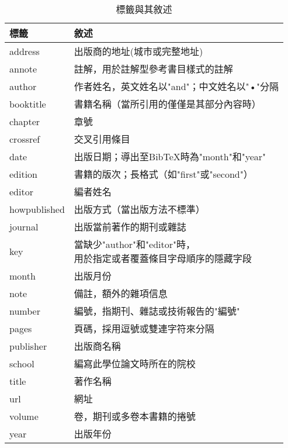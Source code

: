 	
	\begin{table}[H]
	\centering
 	\extrarowheight=3pt
    \caption{標籤與其敘述}\label{ref_lab}
		\begin{tabular}{ll}
		\hline
		標籤 & 敘述 \\
		\hline
		address & 出版商的地址(城市或完整地址) \\
		\rowcolor{lightpink}
		annote & 註解，用於註解型參考書目樣式的註解 \\
		author & 作者姓名，英文姓名以"and"；中文姓名以"•"分隔 \\
		\rowcolor{lightpink}
		booktitle & 書籍名稱（當所引用的僅僅是其部分內容時） \\
		chapter & 章號 \\
		\rowcolor{lightpink}
		crossref & 交叉引用條目 \\
		date & 出版日期；導出至BibTeX時為"month"和"year" \\
		\rowcolor{lightpink}	
		edition & 書籍的版次；長格式（如"first"或"second"） \\
		editor  & 編者姓名 \\
		\rowcolor{lightpink}
		howpublished & 出版方式（當出版方法不標準） \\
		journal & 出版當前著作的期刊或雜誌 \\
		\rowcolor{lightpink}
		key & \tabincell{l}{當缺少"author"和"editor"時，\\用於指定或者覆蓋條目字母順序的隱藏字段}\\
		month & 出版月份 \\
		\rowcolor{lightpink}
		note & 備註，額外的雜項信息 \\
		number & 編號，指期刊、雜誌或技術報告的"編號" \\
		\rowcolor{lightpink}
		pages & 頁碼，採用逗號或雙連字符來分隔\\
		publisher & 出版商名稱 \\
		\rowcolor{lightpink}
		school & 編寫此學位論文時所在的院校 \\
		title & 著作名稱 \\ 
		\rowcolor{lightpink}
		url &  網址 \\
		volume &  卷，期刊或多卷本書籍的捲號 \\
		\rowcolor{lightpink}
		year & 出版年份 \\
		\hline
		\end{tabular}
	\end{table}
	
